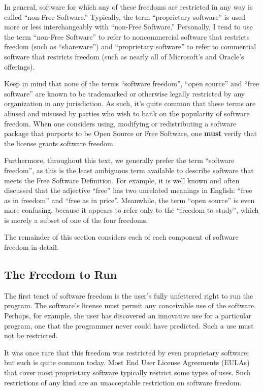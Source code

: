 In general, software for which any of these freedoms are
restricted in any way is called ``non-Free Software.''  Typically, the
term ``proprietary software'' is used more or less interchangeably with
``non-Free Software.''  Personally, I tend to use the term ``non-Free
Software'' to refer to noncommercial software that restricts freedom
(such as ``shareware'') and ``proprietary software'' to refer to
commercial software that restricts freedom (such as nearly all of
Microsoft's and Oracle's offerings).

Keep in mind that none of the terms ``software freedom'', ``open source''
and ``free software'' are known to be trademarked or otherwise legally
restricted by any organization in
any jurisdiction.  As such, it's quite common that these terms are abused and
misused by parties who wish to bank on the popularity of software freedom.
When one considers using, modifying or redistributing a software package that
purports to be Open Source or Free Software, one \textbf{must} verify that
the license grants software freedom.

Furthermore, throughout this text, we generally prefer the term ``software
freedom'', as this is the least ambiguous term available to describe software
that meets the Free Software Definition.  For example, it is well known and
often discussed that the adjective ``free'' has two unrelated meanings in
English: ``free as in freedom'' and ``free as in price''.  Meanwhile, the
term ``open source'' is even more confusing, because it appears to refer only to the
``freedom to study'', which is merely a subset of one of the four freedoms.

The remainder of this section considers each of each component of software
freedom in detail.

\subsection{The Freedom to Run}
\label{freedom-to-run}

The first tenet of software freedom is the user's fully unfettered right to
run the program.  The software's license must permit any conceivable use of
the software.  Perhaps, for example, the user has discovered an innovative
use for a particular program, one that the programmer never could have
predicted.  Such a use must not be restricted.

It was once rare that this freedom was restricted by even proprietary
software; but such is quite common today. Most End User License Agreements
(EULAs) that cover most proprietary software typically restrict some types of
uses.  Such restrictions of any kind are an unacceptable restriction on
software freedom.

